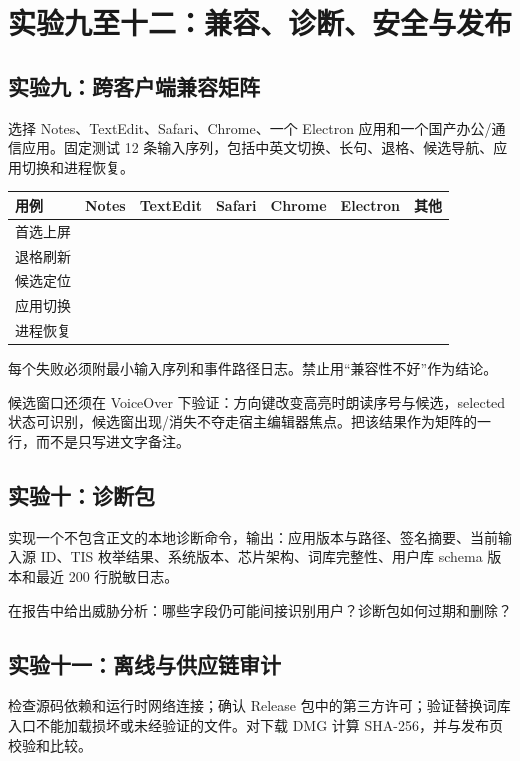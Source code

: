 \chapter{实验九至十二：兼容、诊断、安全与发布}

\section{实验九：跨客户端兼容矩阵}

选择 Notes、TextEdit、Safari、Chrome、一个 Electron 应用和一个国产办公/通信应用。固定测试 12 条输入序列，包括中英文切换、长句、退格、候选导航、应用切换和进程恢复。

\begin{center}
\begin{tabular}{lcccccc}
\toprule
用例 & Notes & TextEdit & Safari & Chrome & Electron & 其他 \\
\midrule
首选上屏 & & & & & & \\
退格刷新 & & & & & & \\
候选定位 & & & & & & \\
应用切换 & & & & & & \\
进程恢复 & & & & & & \\
\bottomrule
\end{tabular}
\end{center}

每个失败必须附最小输入序列和事件路径日志。禁止用“兼容性不好”作为结论。

候选窗口还须在 VoiceOver 下验证：方向键改变高亮时朗读序号与候选，selected 状态可识别，候选窗出现/消失不夺走宿主编辑器焦点。把该结果作为矩阵的一行，而不是只写进文字备注。

\section{实验十：诊断包}

实现一个不包含正文的本地诊断命令，输出：应用版本与路径、签名摘要、当前输入源 ID、TIS 枚举结果、系统版本、芯片架构、词库完整性、用户库 schema 版本和最近 200 行脱敏日志。

在报告中给出威胁分析：哪些字段仍可能间接识别用户？诊断包如何过期和删除？

\section{实验十一：离线与供应链审计}

检查源码依赖和运行时网络连接；确认 Release 包中的第三方许可；验证替换词库入口不能加载损坏或未经验证的文件。对下载 DMG 计算 SHA-256，并与发布页校验和比较。

